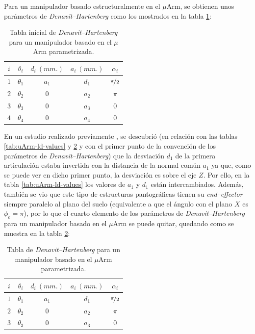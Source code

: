 Para un manipulador basado estructuralmente en el $\mu$Arm, se obtienen unos parámetros
de \textit{Denavit--Hartenberg} como los mostrados en la tabla \ref{tab:dh-params-with-phi}:

\begin{table}[H]
    \centering
    \begin{tabular}{ c | c c c c }
        $i$ & $\theta_i$ & $d_i~(mm.)$ & $a_i~(mm.)$ & $\alpha_i$          \\ [0.5ex]
        \hline
        $1$ & $\theta_1$ & $a_1$       & $d_1$       & $\nicefrac{\pi}{2}$ \\
        $2$ & $\theta_2$ & $0$         & $a_2$       & $\pi$               \\
        $3$ & $\theta_3$ & $0$         & $a_3$       & $0$                 \\
        $4$ & $\theta_4$ & $0$         & $a_4$       & $0$                 \\ [1ex]
    \end{tabular}
    \caption{Tabla inicial de \textit{Denavit–Hartenberg} para un manipulador basado en el $\mu$Arm parametrizada.}
    \label{tab:dh-params-with-phi}
\end{table}

En un estudio realizado previamente \cite{javieralonsosilvaEstudioManipuladorUArm2019},
se descubrió (en relación con las tablas \ref{tab:uArm-ld-values} y \ref{tab:dh-params}
y con el primer punto de la convención de los parámetros de \textit{Denavit--Hartenberg})
que la desviación $d_1$ de la primera articulación estaba invertida con la distancia de la normal común
$a_1$ ya que, como se puede ver en dicho primer punto, la desviación es sobre el eje $Z$.
Por ello, en la tabla \ref{tab:uArm-ld-values} los valores de $a_1$ y $d_1$ están
intercambiados. Además, también se vio que este tipo de estructuras pantográficas
tienen su \textit{end--effector} siempre paralelo al plano del suelo (equivalente
a que el ángulo con el plano $X$ es $\phi_e = \pi$), por lo que el cuarto elemento de
los parámetros de \textit{Denavit--Hartenberg} para un manipulador basado en el $\mu$Arm
se puede quitar, quedando como se muestra en la tabla \ref{tab:dh-params}:

\begin{table}[H]
    \centering
    \begin{tabular}{ c | c c c c }
        $i$ & $\theta_i$ & $d_i~(mm.)$ & $a_i~(mm.)$ & $\alpha_i$          \\ [0.5ex]
        \hline
        $1$ & $\theta_1$ & $a_1$       & $d_1$       & $\nicefrac{\pi}{2}$ \\
        $2$ & $\theta_2$ & $0$         & $a_2$       & $\pi$               \\
        $3$ & $\theta_3$ & $0$         & $a_3$       & $0$                 \\ [1ex]
    \end{tabular}
    \caption{Tabla de \textit{Denavit–Hartenberg} para un manipulador basado en el $\mu$Arm parametrizada.}
    \label{tab:dh-params}
\end{table}

